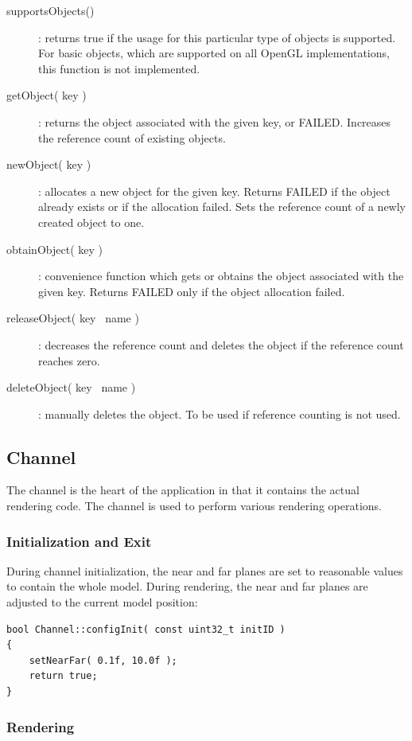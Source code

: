 \documentclass[10pt,a4]{scrartcl}
\begin{document}
\begin{description}
\item[supportsObjects()]: returns true if the usage for this particular
  type of objects is supported. For basic objects, which are supported
  on all OpenGL implementations, this function is not implemented.
\item[getObject( key )]: returns the object associated with the given
  key, or FAILED. Increases the reference count of existing objects.
\item[newObject( key )]: allocates a new object for the given
  key. Returns FAILED if the object already exists or if the allocation
  failed. Sets the reference count of a newly created object to one.
\item[obtainObject( key )]: convenience function which gets or obtains
  the object associated with the given key. Returns FAILED only if the
  object allocation failed.
\item[releaseObject( key \textbar\ name )]: decreases the reference count and
  deletes the object if the reference count reaches zero.
\item[deleteObject( key \textbar\ name )]: manually deletes the object. To be
  used if reference counting is not used.
\end{description}


\subsection{Channel}

The channel is the heart of the application in that it contains the
actual rendering code. The channel is used to perform various rendering
operations.

\subsubsection{Initialization and Exit}

During channel initialization, the near and far planes are set to
reasonable values to contain the whole model. During rendering, the near
and far planes are adjusted to the current model position:

{\footnotesize\begin{lstlisting}
bool Channel::configInit( const uint32_t initID )
{
    setNearFar( 0.1f, 10.0f );
    return true;
}
\end{lstlisting}}

\subsubsection{Rendering}
\end{document}
